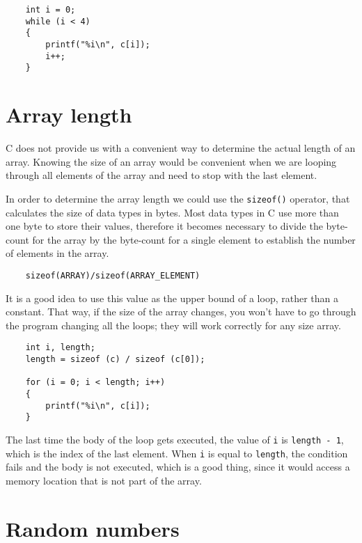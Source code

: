 \begin{verbatim}
    int i = 0;
    while (i < 4) 
    {
        printf("%i\n", c[i]);
        i++;
    }
\end{verbatim}

\section{Array length}
\label{Array length}

C does not provide us with a convenient way to determine the
actual length of an array. Knowing the size of an array would
be convenient when we are looping through all elements of
the array and need to stop with the last element.

In order to determine the array length we could use the {\tt sizeof()} 
operator, that calculates the size of data types in bytes.
Most data types in C use more than one byte to store their values,
therefore it becomes necessary to divide the byte-count for the array by 
the byte-count for a single element to establish the number of elements
in the array.
\begin{verbatim}
    sizeof(ARRAY)/sizeof(ARRAY_ELEMENT)
\end{verbatim}

It is a good idea to use this value as the upper bound of a loop,
rather than a constant.  That way, if the size of the array
changes, you won't have to go through the program changing all the
loops; they will work correctly for any size array.

\begin{verbatim}
    int i, length;
    length = sizeof (c) / sizeof (c[0]);

    for (i = 0; i < length; i++) 
    {
        printf("%i\n", c[i]);
    }
\end{verbatim}
%
The last time the body of the loop gets executed, the value of {\tt i}
is {\tt length - 1}, which is the index of the last element.  When
{\tt i} is equal to {\tt length}, the condition fails and the body
is not executed, which is a good thing, since it would access a
memory location that is not part of the array.

\section{Random numbers}
\label{Random numbers}
\label{random}
\label{pseudorandom}

